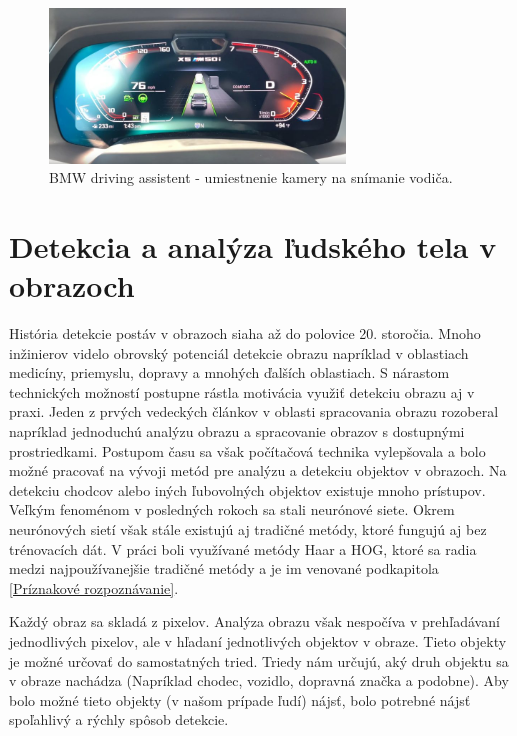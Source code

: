 \documentclass[slovak,master,dept460,male,cpp,cpdeclaration]{diploma}
\begin{document}
\begin{figure}[H]
	\centering
	\includegraphics[width=0.7\textwidth]{Figures/bmw.jpg}
	\caption{BMW driving assistent - umiestnenie kamery na snímanie vodiča.\cite{bmw2019assistent}}
	\label{fig:bmwAssistent}
\end{figure}





\newpage
\section{Detekcia a analýza ľudského tela v obrazoch}
\label{sec:human body decection}

História detekcie postáv v obrazoch siaha až do polovice 20. storočia. Mnoho inžinierov videlo obrovský potenciál detekcie obrazu napríklad v oblastiach medicíny, priemyslu, dopravy a mnohých ďalších oblastiach. S nárastom technických možností postupne rástla motivácia využiť detekciu obrazu aj v praxi. Jeden z prvých vedeckých článkov v oblasti spracovania obrazu \cite{rosenfeld1969} rozoberal napríklad jednoduchú analýzu  obrazu a spracovanie obrazov s dostupnými prostriedkami.  Postupom času sa však počítačová technika vylepšovala a bolo možné pracovať na vývoji metód pre analýzu  a detekciu objektov v obrazoch. Na detekciu chodcov alebo iných ľubovolných objektov existuje mnoho prístupov. Veľkým fenoménom v posledných rokoch sa stali neurónové siete. Okrem neurónových sietí však stále existujú aj tradičné metódy, ktoré fungujú aj bez trénovacích dát. V práci boli využívané metódy Haar a HOG, ktoré sa radia medzi najpoužívanejšie tradičné metódy a je im venované podkapitola \ref{Príznakové rozpoznávanie}.\par
Každý obraz sa skladá z pixelov. Analýza obrazu však nespočíva v prehľadávaní jednodlivých pixelov, ale v hľadaní jednotlivých objektov v obraze. Tieto objekty je možné  určovať do  samostatných tried. Triedy nám určujú, aký druh objektu sa v obraze nachádza (Napríklad chodec, vozidlo, dopravná značka a podobne). Aby bolo možné tieto objekty (v našom prípade ľudí) nájsť, bolo potrebné nájsť spoľahlivý a rýchly spôsob detekcie. 
\end{document}
